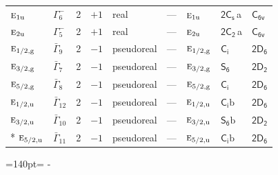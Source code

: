 \documentclass[10pt,a4paper]{article}
\makeatletter
\def\grouprule#1#2{\noalign{\marks\LTgroupmarks{\the\belowrulesep}\nobreak\vskip#1%
  \vskip\aboverulesep}\multispan\LT@cols\unskip{\leaders\hrule\@height#2\hfill\kern\z@}\cr
  \noalign{\penalty\LTrulebreak\vskip\belowrulesep\global\@lastruleclass\z@}}
\newcommand{\needspace}[1]{\par\penalty-100\begingroup\dimen0=#1\relax\dimen2=\pagegoal
  \advance\dimen2-\pagetotal\ifdim\dimen0>\dimen2\relax\ifdim\dimen2>0pt\vfil\break\fi\fi
  \endgroup}
\numberwithin{equation}{section}
\newcommand{\grp}[1]{\mathsf{#1}}
\newcommand{\irr}[1]{\text{\normalfont\scshape #1}}
\newcommand{\ptag}[1]{\mathrm{#1}}
\newcommand{\clsletter}[1]{\,{\scriptsize\color{black!55}#1}}
\newcommand{\secondclass}{\mathrm{b}}
\makeatother
\begin{document}
{\begin{longtable}{@{}llrrlllll@{}}
$\irr{e}_{1\ptag{u}}$ & $\Gamma_{6}^{-}$ & 2 & $+1$ & real & --- & $\irr{e}_{1\ptag{u}}$ & \href{2C1v.pdf}{$\grp{2C_{s}}$}\clsletter{a} & \href{../../../rotation/data/pdf/C6v.pdf}{$\grp{C_{6v}}$}\\
$\irr{e}_{2\ptag{u}}$ & $\Gamma_{5}^{-}$ & 2 & $+1$ & real & --- & $\irr{e}_{2\ptag{u}}$ & \href{2C2.pdf}{$\grp{2C_{2}}$}\clsletter{a} & \href{../../../rotation/data/pdf/C6v.pdf}{$\grp{C_{6v}}$}\\
\grouprule{0pt}{\lightrulewidth}
$\irr{e}_{1/2,\ptag{g}}$ & $\bar{\Gamma}_{9}$ & 2 & $-1$ & pseudoreal & --- & $\irr{e}_{1/2,\ptag{g}}$ & \href{S2.pdf}{$\grp{C_{i}}$} & \href{2D6.pdf}{$\grp{2D_{6}}$}\\
$\irr{e}_{3/2,\ptag{g}}$ & $\bar{\Gamma}_{7}$ & 2 & $-1$ & pseudoreal & --- & $\irr{e}_{3/2,\ptag{g}}$ & \href{S6.pdf}{$\grp{S_{6}}$} & \href{2D2.pdf}{$\grp{2D_{2}}$}\\
$\irr{e}_{5/2,\ptag{g}}$ & $\bar{\Gamma}_{8}$ & 2 & $-1$ & pseudoreal & --- & $\irr{e}_{5/2,\ptag{g}}$ & \href{S2.pdf}{$\grp{C_{i}}$} & \href{2D6.pdf}{$\grp{2D_{6}}$}\\
$\irr{e}_{1/2,\ptag{u}}$ & $\bar{\Gamma}_{12}$ & 2 & $-1$ & pseudoreal & --- & $\irr{e}_{1/2,\ptag{u}}$ & \href{S2b.pdf}{$\grp{C_{i}}\secondclass$} & \href{2D6.pdf}{$\grp{2D_{6}}$}\\
$\irr{e}_{3/2,\ptag{u}}$ & $\bar{\Gamma}_{10}$ & 2 & $-1$ & pseudoreal & --- & $\irr{e}_{3/2,\ptag{u}}$ & \href{S6b.pdf}{$\grp{S_{6}}\secondclass$} & \href{2D2.pdf}{$\grp{2D_{2}}$}\\*
$\irr{e}_{5/2,\ptag{u}}$ & $\bar{\Gamma}_{11}$ & 2 & $-1$ & pseudoreal & --- & $\irr{e}_{5/2,\ptag{u}}$ & \href{S2b.pdf}{$\grp{C_{i}}\secondclass$} & \href{2D6.pdf}{$\grp{2D_{6}}$}\\
\bottomrule\end{longtable}}
\needspace{140pt}
\end{document}

